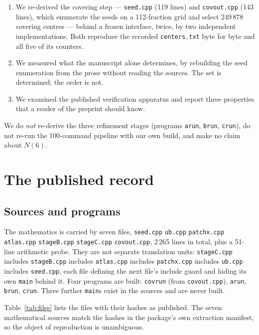 \documentclass[11pt,a4paper]{article}
\newcommand{\code}[1]{\texttt{\small #1}}
\begin{document}
\begin{enumerate}[label=(\roman*)]
\item We re-derived the covering step --- \code{seed.cpp} (119 lines) and \code{covout.cpp}
(143 lines), which enumerate the seeds on a 112-fraction grid and select 249\,878 covering centres ---
behind a frozen interface, twice, by two independent implementations. Both reproduce the recorded
\code{centers.txt} byte for byte and all five of its counters.
\item We measured what the manuscript alone determines, by rebuilding the seed enumeration from the
prose without reading the sources. The set is determined; the order is not.
\item We examined the published verification apparatus and report three properties that a reader of
the preprint should know.
\end{enumerate}

We do \emph{not} re-derive the three refinement stages (programs \code{arun}, \code{brun},
\code{crun}), do not re-run the 100-command pipeline with our own build, and make no claim about
$N(6)$.

\section{The published record}\label{sec:record}

\subsection{Sources and programs}
The mathematics is carried by seven files, \code{seed.cpp} \code{ub.cpp} \code{patchx.cpp}
\code{atlas.cpp} \code{stageB.cpp} \code{stageC.cpp} \code{covout.cpp}, 2\,265 lines in total, plus a
51-line arithmetic probe. They are not separate translation units: \code{stageC.cpp} includes
\code{stageB.cpp} includes \code{atlas.cpp} includes \code{patchx.cpp} includes \code{ub.cpp}
includes \code{seed.cpp}, each file defining the next file's include guard and hiding its own
\code{main} behind it. Four programs are built: \code{covrun} (from \code{covout.cpp}), \code{arun},
\code{brun}, \code{crun}. Three further \code{main}s exist in the sources and are never built.

Table~\ref{tab:files} lists the files with their hashes as published. The seven mathematical sources
match the hashes in the package's own extraction manifest, so the object of reproduction is
unambiguous.
\end{document}

